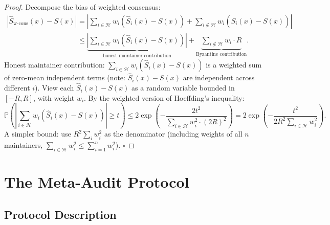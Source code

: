 \documentclass[11pt,a4paper]{article}
\theoremstyle{definition}
\newcommand{\Prob}{\mathbb{P}}
\begin{document}
\begin{proof}
Decompose the bias of weighted consensus:
\begin{align*}
    |\hat{S}_{\text{w-cons}}(x) - S(x)| &= \left|\sum_{i \in \mathcal{H}} w_i(\hat{S}_i(x) - S(x)) + \sum_{i \notin \mathcal{H}} w_i(\hat{S}_i(x) - S(x))\right| \\
    &\leq \underbrace{\left|\sum_{i \in \mathcal{H}} w_i(\hat{S}_i(x) - S(x))\right|}_{\text{honest maintainer contribution}} + \underbrace{\sum_{i \notin \mathcal{H}} w_i \cdot R}_{\text{Byzantine contribution}}.
\end{align*}
Honest maintainer contribution: $\sum_{i \in \mathcal{H}} w_i(\hat{S}_i(x) - S(x))$ is a weighted sum of zero-mean independent terms (note: $\hat{S}_i(x) - S(x)$ are independent across different $i$). View each $\hat{S}_i(x) - S(x)$ as a random variable bounded in $[-R, R]$, with weight $w_i$. By the weighted version of Hoeffding's inequality:
\begin{equation*}
    \Prob\left(\left|\sum_{i \in \mathcal{H}} w_i(\hat{S}_i(x) - S(x))\right| \geq t\right) \leq 2\exp\left(-\frac{2t^2}{\sum_{i \in \mathcal{H}} w_i^2 \cdot (2R)^2}\right) = 2\exp\left(-\frac{t^2}{2R^2 \sum_{i \in \mathcal{H}} w_i^2}\right).
\end{equation*}
A simpler bound: use $R^2 \sum_i w_i^2$ as the denominator (including weights of all $n$ maintainers, $\sum_{i \in \mathcal{H}} w_i^2 \leq \sum_{i=1}^{n} w_i^2$). \hfill$\square$
\end{proof}

\section{The Meta-Audit Protocol}

\subsection{Protocol Description}
\end{document}
